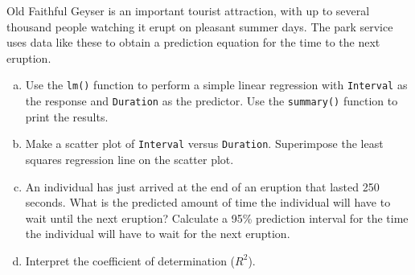 \documentclass[11pt]{article}\usepackage[]{graphicx}\usepackage[]{color}
\begin{document}
Old Faithful Geyser is an important tourist attraction, with up to several thousand people watching it erupt on pleasant summer days.  The park service uses data like these to obtain a prediction equation for the time to the next eruption.

\begin{enumerate}[(a)]
\item Use the \texttt{lm()} function to perform a simple linear regression with \texttt{Interval}  as the response and \texttt{Duration} as the predictor.  Use the \texttt{summary()} function to print the results.
\item Make a scatter plot of \texttt{Interval} versus \texttt{Duration}. Superimpose the least squares regression line on the scatter plot.
\item An individual has just arrived at the end of an eruption that lasted 250 seconds.  What is the predicted amount of time the individual will have to wait until the next eruption?  Calculate a 95\% prediction interval for the time the individual will have to wait for the next eruption.
\item Interpret the coefficient of determination ($R^2$).
\end{enumerate}






\end{document}
